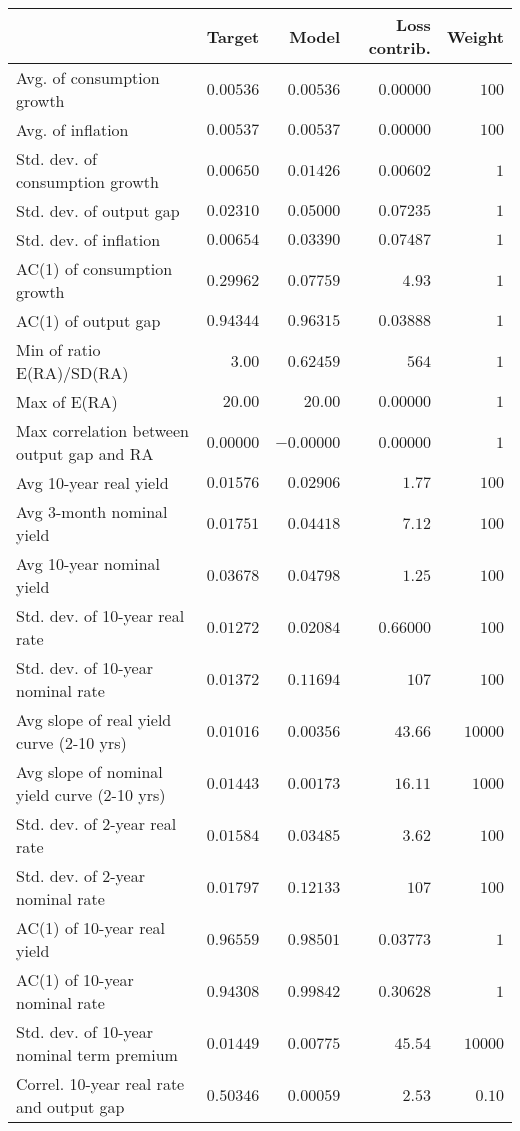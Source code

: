 \begin{tabular}{lrrrr} \hline  & Target & Model & Loss contrib. & Weight \\ \hline Avg. of consumption growth & $0.00536$ & $0.00536$ & $0.00000$ & $100$ \\ Avg. of inflation & $0.00537$ & $0.00537$ & $0.00000$ & $100$ \\ Std. dev. of consumption growth & $0.00650$ & $0.01426$ & $0.00602$ & $1$ \\ Std. dev. of output gap & $0.02310$ & $0.05000$ & $0.07235$ & $1$ \\ Std. dev. of inflation & $0.00654$ & $0.03390$ & $0.07487$ & $1$ \\ AC(1) of consumption growth & $0.29962$ & $0.07759$ & $4.93$ & $1$ \\ AC(1) of output gap & $0.94344$ & $0.96315$ & $0.03888$ & $1$ \\ Min of ratio E(RA)/SD(RA) & $3.00$ & $0.62459$ & $564$ & $1$ \\ Max of E(RA) & $20.00$ & $20.00$ & $0.00000$ & $1$ \\ Max correlation between output gap and RA & $0.00000$ & $-0.00000$ & $0.00000$ & $1$ \\ Avg 10-year real yield & $0.01576$ & $0.02906$ & $1.77$ & $100$ \\ Avg 3-month nominal yield & $0.01751$ & $0.04418$ & $7.12$ & $100$ \\ Avg 10-year nominal yield & $0.03678$ & $0.04798$ & $1.25$ & $100$ \\ Std. dev. of 10-year real rate & $0.01272$ & $0.02084$ & $0.66000$ & $100$ \\ Std. dev. of 10-year nominal rate & $0.01372$ & $0.11694$ & $107$ & $100$ \\ Avg slope of real yield curve (2-10 yrs) & $0.01016$ & $0.00356$ & $43.66$ & $10000$ \\ Avg slope of nominal yield curve (2-10 yrs) & $0.01443$ & $0.00173$ & $16.11$ & $1000$ \\ Std. dev. of 2-year real rate & $0.01584$ & $0.03485$ & $3.62$ & $100$ \\ Std. dev. of 2-year nominal rate & $0.01797$ & $0.12133$ & $107$ & $100$ \\ AC(1) of 10-year real yield & $0.96559$ & $0.98501$ & $0.03773$ & $1$ \\ AC(1) of 10-year nominal rate & $0.94308$ & $0.99842$ & $0.30628$ & $1$ \\ Std. dev. of 10-year nominal term premium & $0.01449$ & $0.00775$ & $45.54$ & $10000$ \\ Correl. 10-year real rate and output gap & $0.50346$ & $0.00059$ & $2.53$ & $0.10$ \\ \hline \end{tabular}